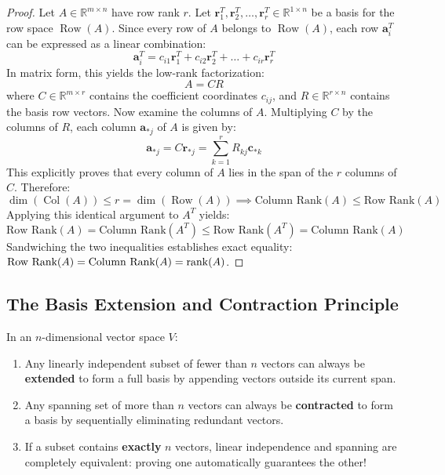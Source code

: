 \begin{proof}
Let $A \in \mathbb{R}^{m \times n}$ have row rank $r$. Let $\mathbf{r}_1^T, \mathbf{r}_2^T, \dots, \mathbf{r}_r^T \in \mathbb{R}^{1 \times n}$ be a basis for the row space $\operatorname{Row}(A)$.
Since every row of $A$ belongs to $\operatorname{Row}(A)$, each row $\mathbf{a}_i^T$ can be expressed as a linear combination:
\begin{equation*}
\mathbf{a}_i^T = c_{i1}\mathbf{r}_1^T + c_{i2}\mathbf{r}_2^T + \dots + c_{ir}\mathbf{r}_r^T
\end{equation*}
In matrix form, this yields the low-rank factorization:
\begin{equation}
A = C R
\end{equation}
where $C \in \mathbb{R}^{m \times r}$ contains the coefficient coordinates $c_{ij}$, and $R \in \mathbb{R}^{r \times n}$ contains the basis row vectors.
Now examine the columns of $A$. Multiplying $C$ by the columns of $R$, each column $\mathbf{a}_{*j}$ of $A$ is given by:
\begin{equation*}
\mathbf{a}_{*j} = C \mathbf{r}_{*j} = \sum_{k=1}^r R_{kj} \mathbf{c}_{*k}
\end{equation*}
This explicitly proves that every column of $A$ lies in the span of the $r$ columns of $C$. Therefore:
\begin{equation*}
\dim(\operatorname{Col}(A)) \le r = \dim(\operatorname{Row}(A)) \implies \text{Column Rank}(A) \le \text{Row Rank}(A)
\end{equation*}
Applying this identical argument to $A^T$ yields:
\begin{equation*}
\text{Row Rank}(A) = \text{Column Rank}(A^T) \le \text{Row Rank}(A^T) = \text{Column Rank}(A)
\end{equation*}
Sandwiching the two inequalities establishes exact equality: $\text{Row Rank}(A) = \text{Column Rank}(A) = \operatorname{rank}(A)$.
\end{proof}

\subsection{The Basis Extension and Contraction Principle}

In an $n$-dimensional vector space $V$:
\begin{enumerate}
    \item Any linearly independent subset of fewer than $n$ vectors can always be \textbf{extended} to form a full basis by appending vectors outside its current span.
    \item Any spanning set of more than $n$ vectors can always be \textbf{contracted} to form a basis by sequentially eliminating redundant vectors.
    \item If a subset contains \textbf{exactly} $n$ vectors, linear independence and spanning are completely equivalent: proving one automatically guarantees the other!
\end{enumerate}


